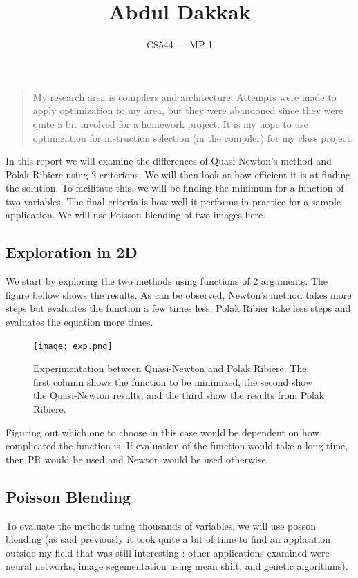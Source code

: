\documentclass[]{article}
\title{Abdul Dakkak}
\author{CS544 --- MP 1}
\date{}
\begin{document}
\maketitle

\begin{quote}
My research area is compilers and architecture. Attempts were made to
apply optimization to my area, but they were abandoned since they were
quite a bit involved for a homework project. It is my hope to use
optimization for instruction selection (in the compiler) for my class
project.
\end{quote}

In this report we will examine the differences of Quasi-Newton's method
and Polak Ribiere using 2 criterions. We will then look at how efficient
it is at finding the solution. To facilitate this, we will be finding
the minimum for a function of two variables. The final criteria is how
well it performs in practice for a sample application. We will use
Poisson blending of two images here.

\subsection{Exploration in 2D}\label{exploration-in-2d}

We start by exploring the two methods using functions of 2 arguments.
The figure bellow shows the results. As can be observed, Newton's method
takes more steps but evaluates the function a few times less. Polak
Ribier take less steps and evaluates the equation more times.

\begin{figure}[t!]
\centering
\texttt{[image: exp.png]}
\caption{Experimentation between Quasi-Newton and Polak Ribiere. The first column shows the function to be minimized, the second show the Quasi-Newton results, and the third show the results from Polak Ribiere.}
\label{fig:exp}
\end{figure}

Figuring out which one to choose in this case would be dependent on how
complicated the function is. If evaluation of the function would take a
long time, then PR would be used and Newton would be used otherwise.

\subsection{Poisson Blending}\label{poisson-blending}

To evaluate the methods using thousands of variables, we will use posson
blending (as said previously it took quite a bit of time to find an
application outside my field that was still interesting : other
applications examined were neural networks, image segementation using
mean shift, and genetic algorithms).
\end{document}
